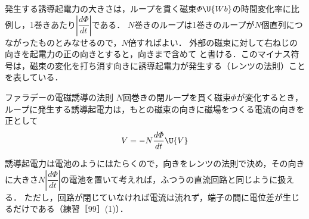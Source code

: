 発生する誘導起電力の大きさは，ループを貫く磁束$\varPhi\U{Wb}$の時間変化率に比例し，1巻きあたり$\left|\dfrac{d\varPhi}{dt}\right|$である．
$N$巻きのループは1巻きのループが$N$個直列につながったものとみなせるので，$N$倍すればよい．
外部の磁束に対して右ねじの向きを起電力の正の向きとすると，向きまで含めて
と書ける．このマイナス符号は，{\gtfamily 磁束の変化を打ち消す向きに誘導起電力が発生する}（レンツの法則）ことを表している．

\bsNeed{30mm}
\begin{matome}{ファラデーの電磁誘導の法則}
 \hspace{3mm} $N$回巻きの閉ループを貫く磁束$\varPhi$が変化するとき，ループに発生する誘導起電力は，もとの磁束の向きに磁場をつくる電流の向きを正として
 \[V=-N\frac{d\varPhi}{dt}\U{V}\]
\end{matome}

誘導起電力は電池のようにはたらくので，{\gtfamily 向きをレンツの法則で決め，その向きに大きさ$N\left|\dfrac{d\varPhi}{dt}\right|$の電池を置いて}考えれば，ふつうの直流回路と同じように扱える．
ただし，回路が閉じていなければ電流は流れず，端子の間に電位差が生じるだけである（練習［99］(1)）．

